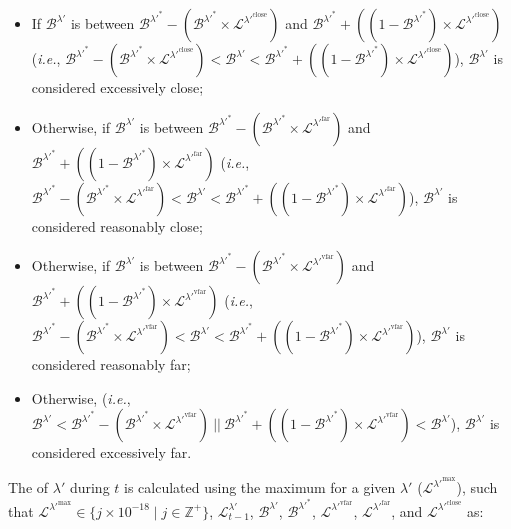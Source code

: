 \documentclass[class=article, crop=false]{standalone}
\begin{document}
\begin{itemize}
    \item If $\mathscr{B}^{\lambda'}$ is between $\mathscr{B}^{\lambda'^{*}} - ( \mathscr{B}^{\lambda'^{*}} \times \mathscr{L}^{\lambda'^{\text{close}}})$ and $\mathscr{B}^{\lambda'^{*}} + ((1 - \mathscr{B}^{\lambda'^{*}}) \times \mathscr{L}^{\lambda'^{\text{close}}})$ (\textit{i.e.}, $\mathscr{B}^{\lambda'^{*}} - ( \mathscr{B}^{\lambda'^{*}} \times \mathscr{L}^{\lambda'^{\text{close}}}) < \mathscr{B}^{\lambda'} < \mathscr{B}^{\lambda'^{*}} + ((1 - \mathscr{B}^{\lambda'^{*}}) \times \mathscr{L}^{\lambda'^{\text{close}}})$), $\mathscr{B}^{\lambda'}$ is considered excessively close;
    
    \item Otherwise, if $\mathscr{B}^{\lambda'}$ is between $\mathscr{B}^{\lambda'^{*}} - ( \mathscr{B}^{\lambda'^{*}} \times \mathscr{L}^{\lambda'^{\text{far}}})$ and $\mathscr{B}^{\lambda'^{*}} + ((1 - \mathscr{B}^{\lambda'^{*}}) \times \mathscr{L}^{\lambda'^{\text{far}}})$ (\textit{i.e.}, $\mathscr{B}^{\lambda'^{*}} - ( \mathscr{B}^{\lambda'^{*}} \times \mathscr{L}^{\lambda'^{\text{far}}}) < \mathscr{B}^{\lambda'} < \mathscr{B}^{\lambda'^{*}} + ((1 - \mathscr{B}^{\lambda'^{*}}) \times \mathscr{L}^{\lambda'^{\text{far}}})$), $\mathscr{B}^{\lambda'}$ is considered reasonably close;
    
    \item Otherwise, if $\mathscr{B}^{\lambda'}$ is between $\mathscr{B}^{\lambda'^{*}} - ( \mathscr{B}^{\lambda'^{*}} \times \mathscr{L}^{\lambda'^{\text{vfar}}})$ and $\mathscr{B}^{\lambda'^{*}} + ((1 - \mathscr{B}^{\lambda'^{*}}) \times \mathscr{L}^{\lambda'^{\text{vfar}}})$ (\textit{i.e.}, $\mathscr{B}^{\lambda'^{*}} - ( \mathscr{B}^{\lambda'^{*}} \times \mathscr{L}^{\lambda'^{\text{vfar}}}) < \mathscr{B}^{\lambda'} < \mathscr{B}^{\lambda'^{*}} + ((1 - \mathscr{B}^{\lambda'^{*}}) \times \mathscr{L}^{\lambda'^{\text{vfar}}})$), $\mathscr{B}^{\lambda'}$ is considered reasonably far;
    
    \item Otherwise, (\textit{i.e.}, $\mathscr{B}^{\lambda'} < \mathscr{B}^{\lambda'^{*}} - ( \mathscr{B}^{\lambda'^{*}} \times \mathscr{L}^{\lambda'^{\text{vfar}}})\ ||\ \mathscr{B}^{\lambda'^{*}} + ((1 - \mathscr{B}^{\lambda'^{*}}) \times \mathscr{L}^{\lambda'^{\text{vfar}}}) < \mathscr{B}^{\lambda'}$), $\mathscr{B}^{\lambda'}$ is considered excessively far. 
\end{itemize}
 
The  of $\lambda'$ during $t$ is calculated using the maximum  for a given $\lambda'$ ($\mathscr{L}^{\lambda'^{\text{max}}}$), such that $\mathscr{L}^{\lambda'^{\text{max}}} \in \{j \times 10^{-18} \mid j \in \mathbb{Z}^{+} \}$, $\mathscr{L}_{t-1}^{\lambda'}$, $\mathscr{B}^{\lambda'}$, $\mathscr{B}^{\lambda'^{*}}$, $\mathscr{L}^{\lambda'^{\text{vfar}}}$, $\mathscr{L}^{\lambda'^{\text{far}}}$, and $\mathscr{L}^{\lambda'^{\text{close}}}$ as:
\end{document}
